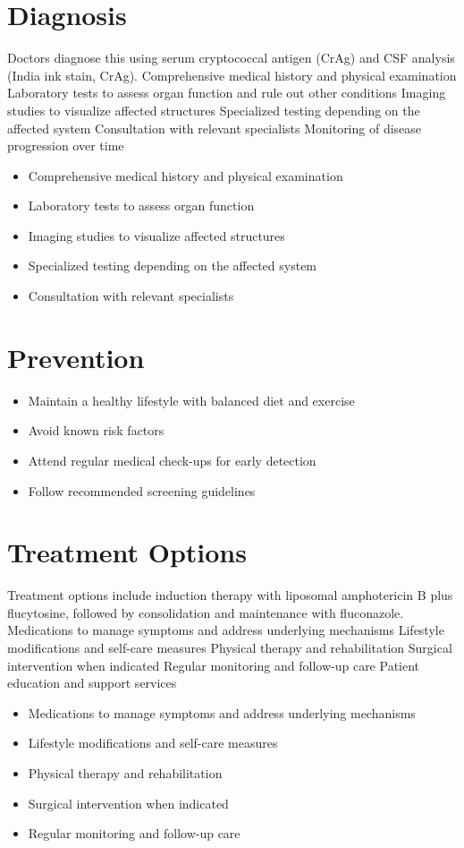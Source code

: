 \section{Diagnosis}
Doctors diagnose this using serum cryptococcal antigen (CrAg) and CSF analysis (India ink stain, CrAg). Comprehensive medical history and physical examination Laboratory tests to assess organ function and rule out other conditions Imaging studies to visualize affected structures Specialized testing depending on the affected system Consultation with relevant specialists Monitoring of disease progression over time

\begin{itemize}[noitemsep]
  \item Comprehensive medical history and physical examination
  \item Laboratory tests to assess organ function
  \item Imaging studies to visualize affected structures
  \item Specialized testing depending on the affected system
  \item Consultation with relevant specialists
\end{itemize}
\section{Prevention}
\begin{itemize}[noitemsep]
  \item Maintain a healthy lifestyle with balanced diet and exercise
  \item Avoid known risk factors
  \item Attend regular medical check-ups for early detection
  \item Follow recommended screening guidelines
\end{itemize}
\section{Treatment Options}
Treatment options include induction therapy with liposomal amphotericin B plus flucytosine, followed by consolidation and maintenance with fluconazole. Medications to manage symptoms and address underlying mechanisms Lifestyle modifications and self-care measures Physical therapy and rehabilitation Surgical intervention when indicated Regular monitoring and follow-up care Patient education and support services

\begin{itemize}[noitemsep]
  \item Medications to manage symptoms and address underlying mechanisms
  \item Lifestyle modifications and self-care measures
  \item Physical therapy and rehabilitation
  \item Surgical intervention when indicated
  \item Regular monitoring and follow-up care
\end{itemize}
